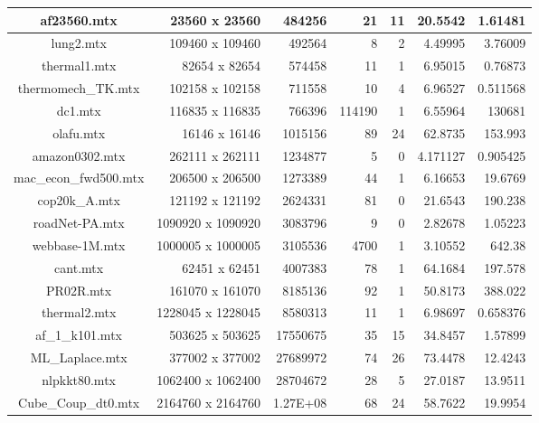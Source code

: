 \begin{table}[!htp]
\begin{adjustbox}{max width=\textwidth}
\begin{tabular}{cr|r|r|r|r|r|}
				\multicolumn{1}{|c|}{af23560.mtx} & 23560 x 23560 & 484256 & 21 & 11 & 20.5542 & 1.61481 \\ \hline
				\multicolumn{1}{|c|}{lung2.mtx} & 109460 x 109460 & 492564 & 8 & 2 & 4.49995 & 3.76009 \\ \hline
				\multicolumn{1}{|c|}{thermal1.mtx} & 82654 x 82654 & 574458 & 11 & 1 & 6.95015 & 0.76873 \\ \hline
				\multicolumn{1}{|c|}{thermomech\_TK.mtx} & 102158 x 102158 & 711558 & 10 & 4 & 6.96527 & 0.511568 \\ \hline
				\multicolumn{1}{|c|}{dc1.mtx} & 116835 x 116835 & 766396 & 114190 & 1 & 6.55964 & 130681 \\ \hline
				\multicolumn{1}{|c|}{olafu.mtx} & 16146 x 16146 & 1015156 & 89 & 24 & 62.8735 & 153.993 \\ \hline
				\multicolumn{1}{|c|}{amazon0302.mtx} & 262111 x 262111 & 1234877 & 5 & 0 & 4.171127 & 0.905425 \\ \hline
				\multicolumn{1}{|c|}{mac\_econ\_fwd500.mtx} & 206500 x 206500 & 1273389 & 44 & 1 & 6.16653 & 19.6769 \\ \hline
				\multicolumn{1}{|c|}{cop20k\_A.mtx} & 121192 x 121192 & 2624331 & 81 & 0 & 21.6543 & 190.238 \\ \hline
				\multicolumn{1}{|c|}{roadNet-PA.mtx} & 1090920 x 1090920 & 3083796 & 9 & 0 & 2.82678 & 1.05223 \\ \hline
				\multicolumn{1}{|c|}{webbase-1M.mtx} & 1000005 x 1000005 & 3105536 & 4700 & 1 & 3.10552 & 642.38 \\ \hline
				\multicolumn{1}{|c|}{cant.mtx} & 62451 x 62451 & 4007383 & 78 & 1 & 64.1684 & 197.578 \\ \hline
				\multicolumn{1}{|c|}{PR02R.mtx} & 161070 x 161070 & 8185136 & 92 & 1 & 50.8173 & 388.022 \\ \hline
				\multicolumn{1}{|c|}{thermal2.mtx} & 1228045 x 1228045 & 8580313 & 11 & 1 & 6.98697 & 0.658376 \\ \hline
				\multicolumn{1}{|c|}{af\_1\_k101.mtx} & 503625 x 503625 & 17550675 & 35 & 15 & 34.8457 & 1.57899 \\ \hline
				\multicolumn{1}{|c|}{ML\_Laplace.mtx} & 377002 x 377002 & 27689972 & 74 & 26 & 73.4478 & 12.4243 \\ \hline
				\multicolumn{1}{|c|}{nlpkkt80.mtx} & 1062400 x 1062400 & 28704672 & 28 & 5 & 27.0187 & 13.9511 \\ \hline
				\multicolumn{1}{|c|}{Cube\_Coup\_dt0.mtx} & 2164760 x 2164760 & 1.27E+08 & 68 & 24 & 58.7622 & 19.9954 \\ \hline
			\end{tabular}
		\end{adjustbox}
	\end{table}
